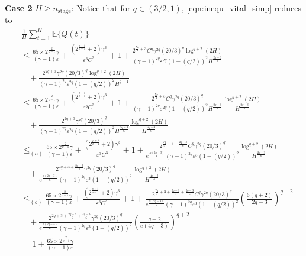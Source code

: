 \documentclass[12pt,draftcls, onecolumn]{IEEEtran}
\begin{document}
{\noindent
\textbf{Case 2} $H \geq n_{\text{stage}}$: Notice that for $q \in (3/2,1)$, \eqref{eqn:inequ_vital_simp} reduces to
\begin{align}\label{eqn:bound_3}
    &\frac{1}{H}\sum_{t = 1}^H \mathbb{E}\{Q(t)\} \nonumber\\&\leq \frac{65\times2^{\frac{2}{p-1}}\gamma }{(\gamma-1) \varepsilon}+\frac{\left(2^{\frac{p+1}{p-1}}+2\right)\gamma^{3}}{\varepsilon^{3}C^{3}}+1 +\frac{2^{\frac{7q}{3}+3}C^q\gamma^{2q}(20/3)^q\log^{q+2}(2H)}{(\gamma-1)^{2q}\varepsilon^{2q}(1-(q/2))^2H^{\frac{2q-3}{3}}}  \nonumber\\&\ \ \ \ + \frac{2^{2q +3}\gamma^{2q}(20/3)^q\log^{q+2}(2H)}{(\gamma-1)^{2q}\varepsilon^{2q}(1-(q/2))^2H^{q-1}} \nonumber\\& \leq  \frac{65\times2^{\frac{2}{p-1}}\gamma }{(\gamma-1) \varepsilon}+\frac{\left(2^{\frac{p+1}{p-1}}+2\right)\gamma^{3}}{\varepsilon^{3}C^{3}}+1 +\frac{2^{\frac{7q}{3}+3}C^q\gamma^{2q}(20/3)^q}{(\gamma-1)^{2q}\varepsilon^{2q}(1-(q/2))^2H^{\frac{2q-3}{6}}}\frac{\log^{q+2}(2H)}{H^{\frac{2q-3}{6}}}  \nonumber\\&\ \ \ \ + \frac{2^{2q +3}\gamma^{2q}(20/3)^q}{(\gamma-1)^{2q}\varepsilon^{2q}(1-(q/2))^2H^{\frac{2q-3}{6}}}\frac{\log^{q+2}(2H)}{H^{\frac{4q-3}{6}}}\nonumber\\& \leq_{(a)}  \frac{65\times2^{\frac{2}{p-1}}\gamma }{(\gamma-1) \varepsilon}+\frac{\left(2^{\frac{p+1}{p-1}}+2\right)\gamma^{3}}{\varepsilon^{3}C^{3}}+1 +\frac{2^{\frac{7q}{3}+3+\frac{2q-3}{6}}C^q\gamma^{2q}(20/3)^q}{e^{\frac{\alpha(2q-3)}{6}}(\gamma-1)^{2q}\varepsilon^{3}(1-(q/2))^2}\frac{\log^{q+2}(2H)}{H^{\frac{2q-3}{6}}}  \nonumber\\&\ \ \ \ + \frac{2^{2q +3+\frac{2q-3}{6}}\gamma^{2q}(20/3)^q}{e^{\frac{\alpha(2q-3)}{6}}(\gamma-1)^{2q}\varepsilon^{3}(1-(q/2))^2}\frac{\log^{q+2}(2H)}{H^{\frac{4q-3}{6}}}\nonumber\\&\leq_{(b)}  \frac{65\times2^{\frac{2}{p-1}}\gamma }{(\gamma-1) \varepsilon}+\frac{\left(2^{\frac{p+1}{p-1}}+2\right)\gamma^{3}}{\varepsilon^{3}C^{3}}+1 +\frac{2^{\frac{7q}{3}+3+\frac{2q-3}{6}+\frac{2q-3}{6}}C^q\gamma^{2q}(20/3)^q}{e^{\frac{\alpha(2q-3)}{6}}(\gamma-1)^{2q}\varepsilon^{3}(1-(q/2))^2}\left(\frac{6(q+2)}{2q-3}\right)^{q+2}  \nonumber\\&\ \ \ \ + \frac{2^{2q +3+\frac{2q-3}{6}+\frac{4q-3}{6}}\gamma^{2q}(20/3)^q}{e^{\frac{\alpha(2q-3)}{6}}(\gamma-1)^{2q}\varepsilon^{3}(1-(q/2))^2}\left(\frac{q+2}{e (4q-3)}\right)^{q+2}\nonumber\\&= 1+\frac{65\times2^{\frac{2}{p-1}}\gamma }{(\gamma-1) \varepsilon}

\end{align}}
\end{document}

